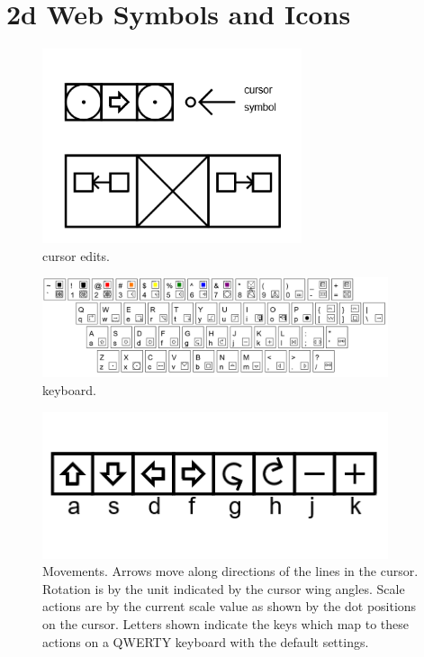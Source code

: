 \section{2d Web Symbols and Icons}


\begin{figure}
	\centering
	\includegraphics[width=3in]{figures/web2d/cursoredit.png}
	\caption[cursoredit]
	{cursor edits.}
\end{figure}

\begin{figure}
	\centering
	\includegraphics[width=4in]{figures/web2d/keyboard.png}
	\caption[keyboard]
	{keyboard.}
\end{figure}

\begin{figure}
	\centering
	\includegraphics[width=4in]{figures/web2d/move.png}
	\caption[move]
	{Movements.  Arrows move along directions of the lines in the cursor.  Rotation is by the unit indicated by the cursor wing angles. Scale actions are by the current scale value as shown by the dot positions on the cursor.  Letters shown indicate the keys which map to these actions on a QWERTY keyboard with the default settings.}
\end{figure}

